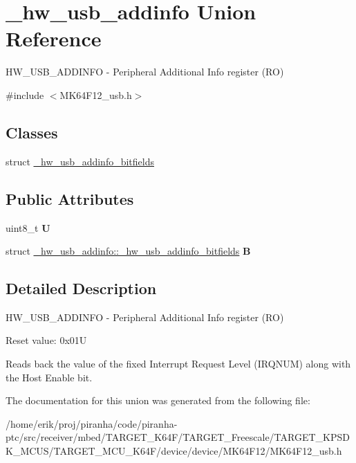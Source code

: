 \hypertarget{union__hw__usb__addinfo}{}\section{\+\_\+hw\+\_\+usb\+\_\+addinfo Union Reference}
\label{union__hw__usb__addinfo}


H\+W\+\_\+\+U\+S\+B\+\_\+\+A\+D\+D\+I\+N\+FO -\/ Peripheral Additional Info register (RO)  




{\ttfamily \#include $<$M\+K64\+F12\+\_\+usb.\+h$>$}

\subsection*{Classes}
\begin{DoxyCompactItemize}
\item 
struct \hyperlink{struct__hw__usb__addinfo_1_1__hw__usb__addinfo__bitfields}{\+\_\+hw\+\_\+usb\+\_\+addinfo\+\_\+bitfields}
\end{DoxyCompactItemize}
\subsection*{Public Attributes}
\begin{DoxyCompactItemize}
\item 
uint8\+\_\+t {\bfseries U}\hypertarget{union__hw__usb__addinfo_ac253f7405ad04dc9f0474c00fbbf1a3a}{}\label{union__hw__usb__addinfo_ac253f7405ad04dc9f0474c00fbbf1a3a}

\item 
struct \hyperlink{struct__hw__usb__addinfo_1_1__hw__usb__addinfo__bitfields}{\+\_\+hw\+\_\+usb\+\_\+addinfo\+::\+\_\+hw\+\_\+usb\+\_\+addinfo\+\_\+bitfields} {\bfseries B}\hypertarget{union__hw__usb__addinfo_aeec2d42bc510021c5fdea9530d2fbb71}{}\label{union__hw__usb__addinfo_aeec2d42bc510021c5fdea9530d2fbb71}

\end{DoxyCompactItemize}


\subsection{Detailed Description}
H\+W\+\_\+\+U\+S\+B\+\_\+\+A\+D\+D\+I\+N\+FO -\/ Peripheral Additional Info register (RO) 

Reset value\+: 0x01U

Reads back the value of the fixed Interrupt Request Level (I\+R\+Q\+N\+UM) along with the Host Enable bit. 

The documentation for this union was generated from the following file\+:\begin{DoxyCompactItemize}
\item 
/home/erik/proj/piranha/code/piranha-\/ptc/src/receiver/mbed/\+T\+A\+R\+G\+E\+T\+\_\+\+K64\+F/\+T\+A\+R\+G\+E\+T\+\_\+\+Freescale/\+T\+A\+R\+G\+E\+T\+\_\+\+K\+P\+S\+D\+K\+\_\+\+M\+C\+U\+S/\+T\+A\+R\+G\+E\+T\+\_\+\+M\+C\+U\+\_\+\+K64\+F/device/device/\+M\+K64\+F12/M\+K64\+F12\+\_\+usb.\+h\end{DoxyCompactItemize}

